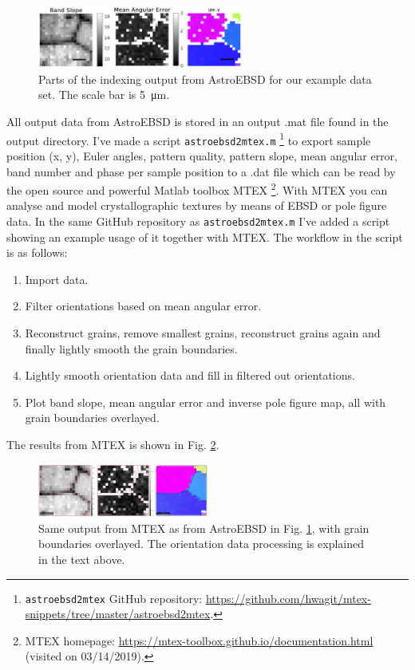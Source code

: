 \documentclass[11pt, twoside]{article}
\begin{document}
\begin{figure}[htb]
  \centering
  \includegraphics[width=0.6\textwidth]{figurer/astroebsd_output/astroebsd_output.eps}
  \caption{Parts of the indexing output from AstroEBSD for our example data set. The scale bar is \SI{5}{\micro\metre}.}
  \label{fig:astroebsd-output}
\end{figure}

All output data from AstroEBSD is stored in an output .mat file found in the output directory. I've made a script \texttt{astroebsd2mtex.m} \footnote{\texttt{astroebsd2mtex} GitHub repository: \url{https://github.com/hwagit/mtex-snippets/tree/master/astroebsd2mtex}.} to export sample position (x, y), Euler angles, pattern quality, pattern slope, mean angular error, band number and phase per sample position to a .dat file which can be read by the open source and powerful Matlab toolbox MTEX \footnote{MTEX homepage: \url{https://mtex-toolbox.github.io/documentation.html} (visited on 03/14/2019).}. With MTEX you can analyse and model crystallographic textures by means of EBSD or pole figure data. In the same GitHub repository as \texttt{astroebsd2mtex.m} I've added a script showing an example usage of it together with MTEX. The workflow in the script is as follows:

\begin{enumerate}
  \item Import data.
  \item Filter orientations based on mean angular error.
  \item Reconstruct grains, remove smallest grains, reconstruct grains again and finally lightly smooth the grain boundaries.
  \item Lightly smooth orientation data and fill in filtered out orientations.
  \item Plot band slope, mean angular error and inverse pole figure map, all with grain boundaries overlayed.
\end{enumerate}

The results from MTEX is shown in Fig. \ref{fig:mtex-output}.

\begin{figure}[ht]
  \centering
  \includegraphics[width=0.5\textwidth]{figurer/mtex_output/mtex_output.eps}
  \caption{Same output from MTEX as from AstroEBSD in Fig. \ref{fig:astroebsd-output}, with grain boundaries overlayed. The orientation data processing is explained in the text above.}
  \label{fig:mtex-output}
\end{figure}


\printbibliography
\end{document}
